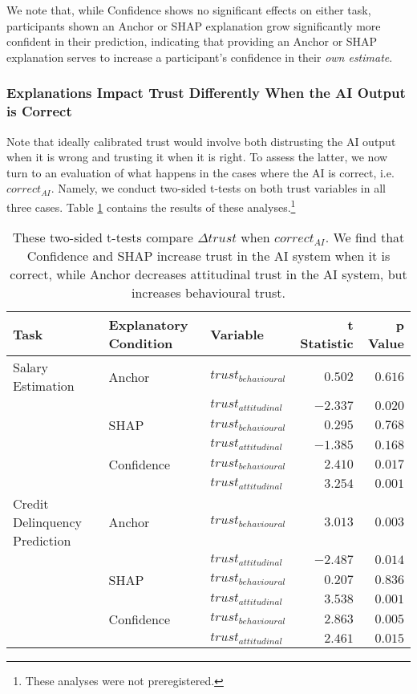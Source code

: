 We note that, while Confidence shows no significant effects on either task, participants shown an Anchor or SHAP explanation grow significantly more confident in their prediction, indicating that providing an Anchor or SHAP explanation serves to increase a participant's confidence in their \emph{own estimate}.

\subsubsection{Explanations Impact Trust Differently When the AI Output is Correct}
Note that ideally calibrated trust would involve both distrusting the AI output when it is wrong and trusting it when it is right. To assess the latter, we now turn to an evaluation of what happens in the cases where the AI is correct, i.e. $correct_{AI}$. Namely, we conduct two-sided t-tests on both trust variables in all three cases. Table \ref{tab:delta-trust-t-positives} contains the results of these analyses.\footnote{These analyses were not preregistered.}

\begin{table}[htb]
    \caption{These two-sided t-tests compare $\Delta trust$ when $correct_{AI}$. We find that Confidence and SHAP increase trust in the AI system when it is correct, while Anchor decreases attitudinal trust in the AI system, but increases behavioural trust.}
    \label{tab:delta-trust-t-positives}
    \begin{tabular}{lllrr}
        \toprule
        Task & Explanatory Condition & Variable & t Statistic & p Value \\ 
        \midrule
        Salary Estimation & Anchor & $trust_{behavioural}$ & $0.502$ & $0.616$ \\
        & & $trust_{attitudinal}$ & $\mathbf{-2.337}$ & $\mathbf{0.020}$ \\
        & SHAP & $trust_{behavioural}$ & $0.295$ & $0.768$ \\
        & & $trust_{attitudinal}$ & $-1.385$ & $0.168$ \\
        & Confidence & $trust_{behavioural}$ & $\mathbf{2.410}$ & $\mathbf{0.017}$ \\
        & & $trust_{attitudinal}$ & $\mathbf{3.254}$ & $\mathbf{0.001}$ \\
        \midrule
        Credit Delinquency Prediction & Anchor & $trust_{behavioural}$ & $\mathbf{3.013}$ & $\mathbf{0.003}$ \\
        & & $trust_{attitudinal}$ & $\mathbf{-2.487}$ & $\mathbf{0.014}$ \\
        & SHAP & $trust_{behavioural}$ & $0.207$ & $0.836$ \\
        & & $trust_{attitudinal}$ & $\mathbf{3.538}$ & $\mathbf{0.001}$ \\
        & Confidence & $trust_{behavioural}$ & $\mathbf{2.863}$ & $\mathbf{0.005}$ \\
        & & $trust_{attitudinal}$ & $\mathbf{2.461}$ & $\mathbf{0.015}$ \\
        \bottomrule
    \end{tabular}
\end{table}


